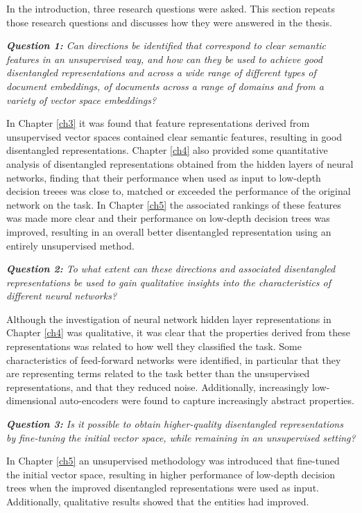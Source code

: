 In the introduction, three research questions were asked. This section repeats those research questions and discusses how they were answered in the thesis.

\textit{\textbf{Question 1:} Can directions be identified that correspond to clear semantic features in an unsupervised way, and how can they be used to achieve good disentangled representations and across a wide range of different types of document embeddings,  of documents across a range of domains and from a variety of vector space embeddings?}

In Chapter \ref{ch3} it was found that feature representations derived from unsupervised vector spaces contained clear semantic features, resulting in good disentangled representations. Chapter \ref{ch4} also provided some quantitative analysis of  disentangled representations obtained from the hidden layers of neural networks, finding that their performance when used as input to low-depth decision treees was close to, matched or exceeded the performance of the original network on the task. In Chapter \ref{ch5} the associated rankings of these features was made more clear and their performance on low-depth decision trees was improved, resulting in an overall better disentangled representation using an entirely unsupervised method.

\textit{\textbf{Question 2:} To what extent can these directions and associated disentangled representations be used to gain qualitative insights into the characteristics of different neural networks?}

Although the investigation of neural network hidden layer representations in Chapter \ref{ch4} was qualitative, it was clear that the properties derived from these representations was related to how well they classified the task. Some characteristics of feed-forward networks were identified, in particular that they are representing terms related to the task better than the unsupervised representations, and that they reduced noise. Additionally, increasingly low-dimensional auto-encoders were found to capture increasingly abstract properties.

\textit{\textbf{Question 3:} Is it possible to obtain higher-quality disentangled representations by fine-tuning the initial vector space, while remaining in an unsupervised setting?}

In Chapter \ref{ch5} an unsupervised methodology was introduced that fine-tuned the initial vector space, resulting in higher performance of low-depth decision trees  when the improved disentangled representations were used as input. Additionally, qualitative results showed that the entities had improved. 


